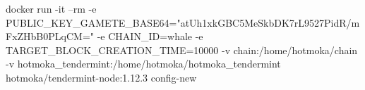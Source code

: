\begin{shellcommandbox}\begin{ttlst}
docker run -it --rm -e PUBLIC_KEY_GAMETE_BASE64="atUh1xkGBC5MeSkbDK7rL9527PidR/mFxZHbB0PLqCM=" -e CHAIN_ID=whale -e TARGET_BLOCK_CREATION_TIME=10000 -v chain:/home/hotmoka/chain -v hotmoka_tendermint:/home/hotmoka/hotmoka_tendermint hotmoka/tendermint-node:1.12.3 config-new
\end{ttlst}\end{shellcommandbox}
